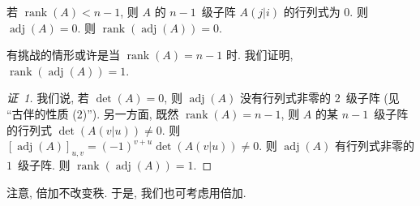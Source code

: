 \documentclass[../libro.tex]{subfiles}
\begin{document}
若 \(\operatorname{rank} {(A)} < n - 1\),
则 \(A\) 的 \(n-1\)~级子阵 \(A(j|i)\) 的行列式为 \(0\).
则 \(\operatorname{adj} {(A)} = 0\).
则 \(\operatorname{rank} {(\operatorname{adj} {(A)})} = 0\).

有挑战的情形或许是当 \(\operatorname{rank} {(A)} = n - 1\) 时.
我们证明,
\(\operatorname{rank} {(\operatorname{adj} {(A)})} = 1\).

\begin{proof}[证~1]
    我们说, 若 \(\det {(A)} = 0\),
    则 \(\operatorname{adj} {(A)}\)
    没有行列式非零的 \(2\)~级子阵
    (见 ``古伴的性质 (2)'').
    另一方面, 既然 \(\operatorname{rank} {(A)} = n - 1\),
    则 \(A\) 的某 \(n-1\)~级子阵的行列式
    \(\det {(A(v|u))} \neq 0\).
    则 \([\operatorname{adj} {(A)}]_{u,v}
    = (-1)^{v+u} \det {(A(v|u))} \neq 0\).
    则 \(\operatorname{adj} {(A)}\)
    有行列式非零的 \(1\)~级子阵.
    则 \(\operatorname{rank} {(\operatorname{adj} {(A)})} = 1\).
\end{proof}

注意, 倍加不改变秩.
于是, 我们也可考虑用倍加.
\end{document}
